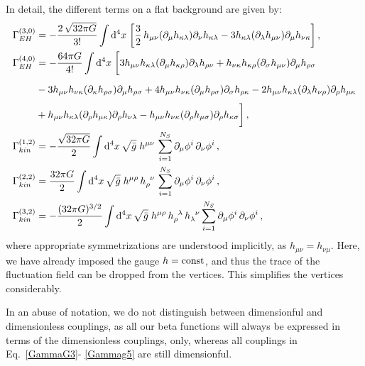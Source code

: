 \documentclass[11pt]{book} %
\numberwithin{equation}{chapter}
\begin{document}
In detail, the different terms on a flat background are given by:
\begin{align}
  \Gamma_{EH}^{(3,0)} &= -\frac{ 2 \, \sqrt{32\pi G} }{ 3! } \int \mathrm d^4x \;
  \bigg[
    \frac{3}{2} \, h_{\mu\nu}(\partial_{\mu}h_{\kappa\lambda})\partial_{\nu}h_{\kappa\lambda}
    - 3 h_{\kappa \lambda}(\partial_{\lambda}h_{\mu\nu})\partial_{\mu}h_{\nu\kappa}
  \bigg] \,, \label{GammaG3} \\
  \Gamma_{EH}^{(4,0)} &= - \frac{ 64\pi G }{ 4! }  \int \mathrm d^4x \;
  \bigg[
    3h_{\mu\nu}h_{\kappa\lambda} (\partial_{\mu}h_{\kappa\rho})\partial_{\lambda}h_{\rho\nu}
    + h_{\nu\kappa}h_{\kappa\rho}(\partial_{\sigma}h_{\mu\nu})\partial_{\mu}h_{\rho\sigma} \nonumber \\
    & \vphantom{ \frac{ 64\pi G }{ 4! } } - 3 h_{\mu\nu}h_{\nu\kappa}(\partial_{\kappa}h_{\rho\sigma})\partial_{\mu}h_{\rho\sigma}
    + 4 h_{\mu\nu}h_{\nu\kappa}(\partial_{\mu}h_{\rho\sigma})\partial_{\sigma}h_{\rho\kappa}
    - 2 h_{\mu\nu}h_{\kappa \lambda}(\partial_{\lambda}h_{\nu\rho})\partial_{\rho}h_{\mu\kappa} \nonumber\\
    & \vphantom{ \frac{ 64\pi G }{ 4! } } +  h_{\mu\nu}h_{\kappa\lambda}(\partial_{\rho}h_{\mu\kappa}) \partial_{\rho}h_{\nu\lambda}
    -  h_{\mu\nu}h_{\nu\kappa}(\partial_{\rho}h_{\mu\sigma})\partial_{\rho}h_{\kappa\sigma}
  \bigg] \,, \label{GammaG4}\\
  \Gamma_{kin}^{(1,2)} &= - \frac{\sqrt{32 \pi  G}}{2}   \int \mathrm d^4x \, \sqrt{\bar{g}} \; h^{\mu \nu} \, \sum_{i=1}^{N_S} \partial_{\mu}\phi^i \, \partial_{\nu}\phi^i \,, \label{Gammag3} \\
  \Gamma_{kin}^{(2,2)} &=   \frac{ 32 \pi  G}{2 }        \int \mathrm d^4x \, \sqrt{\bar{g}} \; h^{\mu \rho} \, h_{\rho}^{\phantom{\rho}\nu} \, \sum_{i=1}^{N_S} \partial_{\mu}\phi^i \, \partial_{\nu}\phi^i \,, \label{Gammag4} \\
  \Gamma_{kin}^{(3,2)} &= - \frac{(32 \pi  G)^{3/2}}{2}  \int \mathrm d^4x \, \sqrt{\bar{g}} \; h^{\mu \rho} \, h_{\rho}^{\phantom{\rho}\lambda} \, h_{\lambda}^{\phantom{\lambda}\nu}
  \sum_{i=1}^{N_S}\partial_{\mu}\phi^i \, \partial_{\nu}\phi^i \,, \label{Gammag5}
\end{align}
where appropriate symmetrizations are understood implicitly, as $h_{\mu \nu} = h_{\nu \mu}$.
Here, we have already imposed the gauge $h= \rm const$,
and thus the trace of the fluctuation field can be dropped from the vertices.
This simplifies the vertices considerably.

In an abuse of notation, we do not distinguish between dimensionful and dimensionless couplings,
as all our beta functions will always be expressed in terms of the dimensionless couplings, only,
whereas all couplings in Eq.~\eqref{GammaG3}- \eqref{Gammag5} are still dimensionful.
\end{document}
